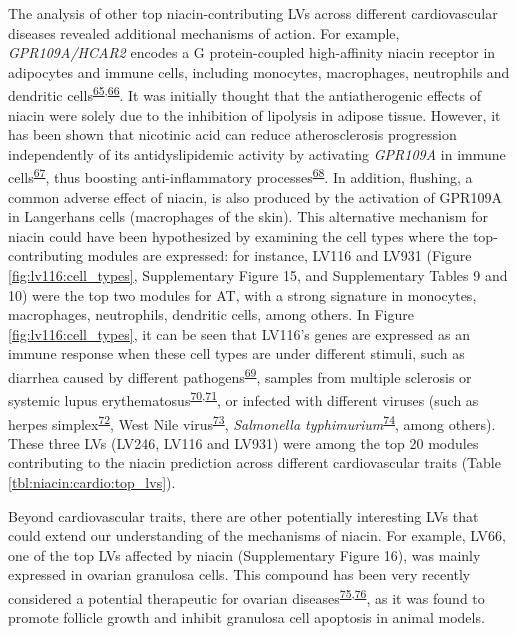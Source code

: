 \documentclass[
  a4paper,
]{article}
\begin{document}
The analysis of other top niacin-contributing LVs across different cardiovascular diseases revealed additional mechanisms of action.
For example, \emph{GPR109A/HCAR2} encodes a G protein-coupled high-affinity niacin receptor in adipocytes and immune cells, including monocytes, macrophages, neutrophils and dendritic cells\textsuperscript{\protect\hyperlink{ref-izbPw2kc}{65},\protect\hyperlink{ref-wI0IjT3i}{66}}.
It was initially thought that the antiatherogenic effects of niacin were solely due to the inhibition of lipolysis in adipose tissue.
However, it has been shown that nicotinic acid can reduce atherosclerosis progression independently of its antidyslipidemic activity by activating \emph{GPR109A} in immune cells\textsuperscript{\protect\hyperlink{ref-1Bz0jRHYo}{67}}, thus boosting anti-inflammatory processes\textsuperscript{\protect\hyperlink{ref-1DblG8swn}{68}}.
In addition, flushing, a common adverse effect of niacin, is also produced by the activation of GPR109A in Langerhans cells (macrophages of the skin).
This alternative mechanism for niacin could have been hypothesized by examining the cell types where the top-contributing modules are expressed:
for instance, LV116 and LV931 (Figure \ref{fig:lv116:cell_types}, Supplementary Figure 15, and Supplementary Tables 9 and 10) were the top two modules for AT, with a strong signature in monocytes, macrophages, neutrophils, dendritic cells, among others.
In Figure \ref{fig:lv116:cell_types}, it can be seen that LV116's genes are expressed as an immune response when these cell types are under different stimuli, such as diarrhea caused by different pathogens\textsuperscript{\protect\hyperlink{ref-RliFvowC}{69}}, samples from multiple sclerosis or systemic lupus erythematosus\textsuperscript{\protect\hyperlink{ref-D5XBhzim}{70},\protect\hyperlink{ref-EnoqU4ga}{71}}, or infected with different viruses (such as herpes simplex\textsuperscript{\protect\hyperlink{ref-11eausmiy}{72}}, West Nile virus\textsuperscript{\protect\hyperlink{ref-mtMYROCN}{73}}, \emph{Salmonella typhimurium}\textsuperscript{\protect\hyperlink{ref-1kgcHkGm}{74}}, among others).
These three LVs (LV246, LV116 and LV931) were among the top 20 modules contributing to the niacin prediction across different cardiovascular traits (Table \ref{tbl:niacin:cardio:top_lvs}).

Beyond cardiovascular traits, there are other potentially interesting LVs that could extend our understanding of the mechanisms of niacin.
For example, LV66, one of the top LVs affected by niacin (Supplementary Figure 16), was mainly expressed in ovarian granulosa cells.
This compound has been very recently considered a potential therapeutic for ovarian diseases\textsuperscript{\protect\hyperlink{ref-kLRErKXz}{75},\protect\hyperlink{ref-TovvsrDr}{76}}, as it was found to promote follicle growth and inhibit granulosa cell apoptosis in animal models.
\end{document}
